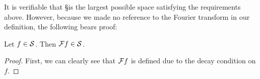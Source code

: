       It is verifiable that \S is the largest possible space satisfying the requirements above.
      However, because we made no reference to the Fourier transform in our definition, the following bears proof:

      \begin{lemma}
        \label{lemma:sclosed}
        Let $f\in\S$.
        Then $\F f\in\S$.
        \begin{proof}
          First, we can clearly see that $\F f$ is defined due to the decay condition on $f$.
        \end{proof}
      \end{lemma}
%


